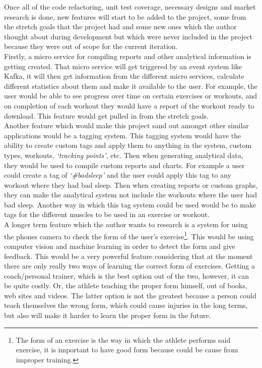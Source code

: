 \documentclass{article}
\newcommand{\tps}{\textit{`tracking points'}}
\begin{document}
\begin{multicols}{2}
Once all of the code refactoring, unit test coverage, necessary designs and market research is done, new features will start to be added to the project, some from the stretch goals that the project had and some new ones which the author thought about during development but which were never included in the project because they were out of scope for the current iteration.\\
Firstly, a micro service for compiling reports and other analytical information is getting created. That micro service will get triggered by an event system like Kafka, it will then get information from the different micro services, calculate different statistics about them and make it available to the user. For example, the user would be able to see progress over time on certain exercises or workouts, and on completion of each workout they would have a report of the workout ready to download. This feature would get pulled in from the stretch goals.\\
Another feature which would make this project sand out amongst other similar applications would be a tagging system. This tagging system would have the ability to create custom tags and apply them to anything in the system, custom types, workouts, \tps, etc. Then when generating analytical data, they would be used to compile custom reports and charts. For example a user could create a tag of \textit{`#badsleep'} and the user could apply this tag to any workout where they had bad sleep. Then when creating reports or custom graphs, they can make the analytical system not include the workouts where the user had bad sleep. Another way in which this tag system could be used would be to make tags for the different muscles to be used in an exercise or workout.\\
A longer term feature which the author wants to research is a system for using the phones camera to check the form of the user's exercise\footnote{The form of an exercise is the way in which the athlete performs said exercise, it is important to have good form because could be cause from improper training.}. This would be using computer vision and machine learning in order to detect the form and give feedback. This would be a very powerful feature considering that at the moment there are only really two ways of learning the correct form of exercises. Getting a coach/personal trainer, which is the best option out of the two, however, it can be quite costly. Or, the athlete teaching the proper form himself, out of books, web sites and videos. The latter option is not the greatest because a person could teach themselves the wrong form, which could cause injuries in the long terms, but also will make it harder to learn the proper form in the future.


\end{multicols}
\end{document}

